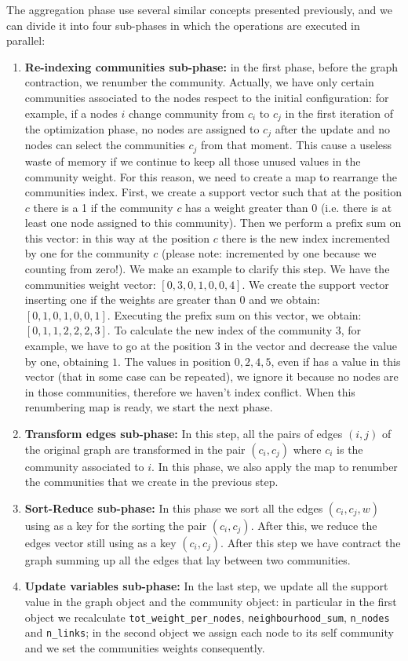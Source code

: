 The aggregation phase use several similar concepts presented previously, and we can divide it into four sub-phases in which the operations are executed in parallel:
\begin{enumerate}
	\item \textbf{Re-indexing communities sub-phase:}\label{Re-indexing} in the first phase, before the graph contraction, we renumber the community. Actually, we have only certain communities associated to the nodes respect to the initial configuration: for example, if a nodes $i$ change community from $c_i$ to $c_j$ in the first iteration of the optimization phase, no nodes are assigned to $c_j$ after the update and no nodes can select the communities $c_j$ from that moment. This cause a useless waste of memory if we continue to keep all those unused values in the community weight. For this reason, we need to create a map to rearrange the communities index.
	First, we create a support vector such that at the position $c$ there is a 1 if the community $c$ has a weight greater than 0 (i.e. there is at least one node assigned to this community). Then we perform a prefix sum on this vector: in this way at the position $c$ there is the new index incremented by one for the community $c$ (please note: incremented by one because we counting from zero!). We make an example to clarify this step. We have the communities weight vector: $[0,3,0,1,0,0,4]$. We create the support vector inserting one if the weights are greater than 0 and we obtain: $[0,1,0,1,0,0,1]$. Executing the prefix sum on this vector, we obtain: $[0,1,1,2,2,2,3]$. To calculate the new index of the community $3$, for example, we have to go at the position $3$ in the vector and decrease the value by one, obtaining $1$. The values in position $0,2,4,5$, even if has a value in this vector (that in some case can be repeated), we ignore it because no nodes are in those communities, therefore we haven't index conflict. When this renumbering map is ready, we start the next phase.
	\item \textbf{Transform edges sub-phase:} In this step, all the pairs of edges $(i, j)$ of the original graph are transformed in the pair $(c_i, c_j)$ where $c_i$ is the community associated to $i$. In this phase, we also apply the map to renumber the communities that we create in the previous step. 
	\item \textbf{Sort-Reduce sub-phase:} In this phase we sort all the edges $(c_i, c_j, w)$ using as a key for the sorting the pair $(c_i, c_j)$. After this, we reduce the edges vector still using as a key $(c_i, c_j)$. After this step we have contract the graph summing up all the edges that lay between two communities.
	\item \textbf{Update variables sub-phase:}\label{updategraph}  In the last step, we update all the support value in the graph object and the community object: in particular in the first object we recalculate \verb|tot_weight_per_nodes|, \verb|neighbourhood_sum|, \verb|n_nodes| and \verb|n_links|; in the second object we assign each node to its self community and we set the communities weights consequently.
\end{enumerate}
